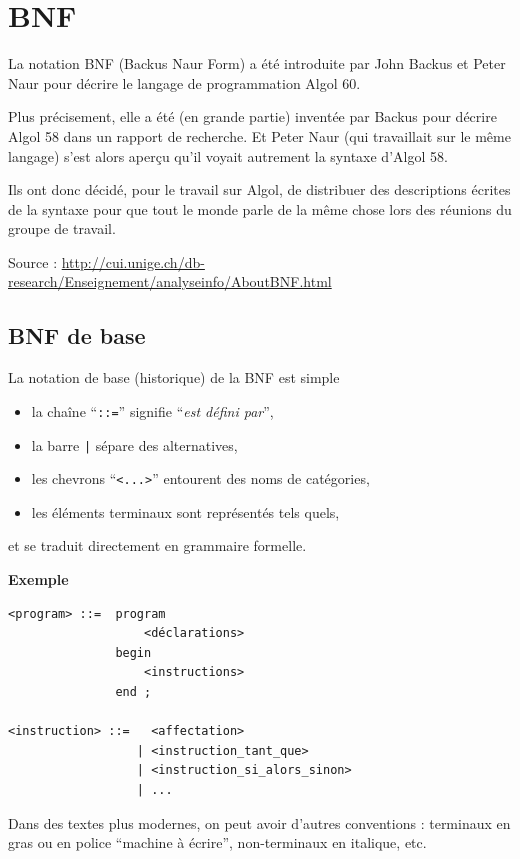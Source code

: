 \section{BNF}


La notation BNF (Backus Naur Form)  a été
introduite par John Backus et Peter Naur
 pour décrire le langage de programmation Algol 60.

Plus précisement, elle a été (en grande partie) inventée par
Backus pour décrire Algol 58 dans un rapport de recherche.
Et Peter Naur (qui travaillait sur le même langage) 
s'est alors aperçu qu'il voyait autrement
la syntaxe d'Algol 58.

Ils ont donc décidé, pour le travail
sur Algol, 
de distribuer des descriptions écrites de la 
syntaxe pour que tout le monde parle de la même chose
lors des réunions du groupe de travail. 

{\scriptsize
Source : \url{http://cui.unige.ch/db-research/Enseignement/analyseinfo/AboutBNF.html}}

\subsection{BNF de base}

La notation de base (historique) de la BNF est simple 
\begin{itemize}
 \item la chaîne ``\texttt{::=}'' signifie ``\emph{est défini par}'',
\item la barre \verb+|+ sépare des alternatives,
\item les chevrons ``\verb/<...>/'' entourent des noms de catégories,
\item les éléments terminaux sont représentés tels quels,
\end{itemize}
et se traduit directement en grammaire formelle.

\textbf{Exemple}
\begin{lstlisting}[frame=single]
<program> ::=  program
                   <déclarations>
               begin
                   <instructions>
               end ;

<instruction> ::=   <affectation>
                  | <instruction_tant_que>
                  | <instruction_si_alors_sinon>
                  | ...
\end{lstlisting}


Dans des textes plus modernes, on peut avoir d'autres conventions :
terminaux en gras ou en police ``machine à écrire'', non-terminaux
 en italique, etc.

